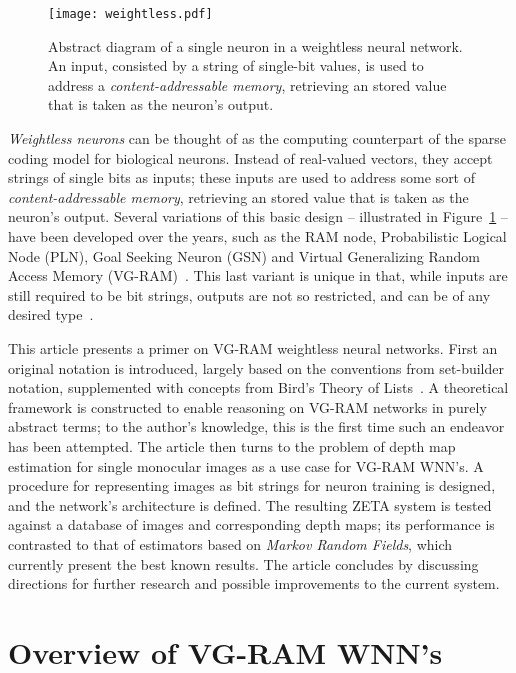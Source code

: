 \documentclass[twocolumn, 9pt]{jsproceedings}
\begin{document}
\begin{figure}[h!]
\texttt{[image: weightless.pdf]}
\caption{Abstract diagram of a single neuron in a weightless neural network. An input, consisted by a string of single-bit values, is used to address a {\it content-addressable memory}, retrieving an stored value that is taken as the neuron's output.}
\label{fig:weightless}
\end{figure}

{\it Weightless neurons} can be thought of as the computing counterpart of the sparse coding model for biological neurons. Instead of real-valued vectors, they accept strings of single bits as inputs; these inputs are used to address some sort of {\it content-addressable memory}, retrieving an stored value that is taken as the neuron's output. Several variations of this basic design -- illustrated in Figure~\ref{fig:weightless} -- have been developed over the years, such as the RAM node, Probabilistic Logical Node (PLN), Goal Seeking Neuron (GSN) and Virtual Generalizing Random Access Memory (VG-RAM)~\cite{ludermir98}. This last variant is unique in that, while inputs are still required to be bit strings, outputs are not so restricted, and can be of any desired type~\cite{souza08}.

This article presents a primer on VG-RAM weightless neural networks. First an original notation is introduced, largely based on the conventions from set-builder notation, supplemented with concepts from Bird's Theory of Lists~\cite{bird87}. A theoretical framework is constructed to enable reasoning on VG-RAM networks in purely abstract terms; to the author's knowledge, this is the first time such an endeavor has been attempted. The article then turns to the problem of depth map estimation for single monocular images as a use case for VG-RAM WNN's. A procedure for representing images as bit strings for neuron training is designed, and the network's architecture is defined. The resulting ZETA system is tested against a database of images and corresponding depth maps; its performance is contrasted to that of estimators based on {\it Markov Random Fields}, which currently present the best known results. The article concludes by discussing directions for further research and possible improvements to the current system.

\section{Overview of VG-RAM WNN's}
\end{document}
